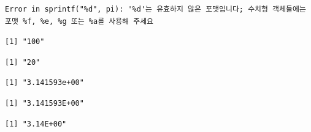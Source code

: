 \documentclass[
  11pt,
]{krantz}
\newenvironment{Shaded}{\begin{snugshade}}{\end{snugshade}}
\newcommand{\CommentTok}[1]{\textcolor[rgb]{0.37,0.37,0.37}{\textit{#1}}}
\newcommand{\DecValTok}[1]{\textcolor[rgb]{0.06,0.06,0.06}{#1}}
\newcommand{\KeywordTok}[1]{\textcolor[rgb]{0.27,0.27,0.27}{\textbf{#1}}}
\newcommand{\NormalTok}[1]{#1}
\newcommand{\StringTok}[1]{\textcolor[rgb]{0.5,0.5,0.5}{#1}}
\begin{document}
\begin{verbatim}
Error in sprintf("%d", pi): '%d'는 유효하지 않은 포맷입니다; 수치형 객체들에는 포맷 %f, %e, %g 또는 %a를 사용해 주세요
\end{verbatim}

\begin{Shaded}
\end{Shaded}

\begin{verbatim}
[1] "100"
\end{verbatim}

\begin{verbatim}
[1] "20"
\end{verbatim}

\begin{Shaded}
\end{Shaded}

\begin{verbatim}
[1] "3.141593e+00"
\end{verbatim}

\begin{Shaded}
\end{Shaded}

\begin{verbatim}
[1] "3.141593E+00"
\end{verbatim}

\begin{Shaded}
\end{Shaded}

\begin{verbatim}
[1] "3.14E+00"
\end{verbatim}

\begin{Shaded}
\end{Shaded}
\end{document}
